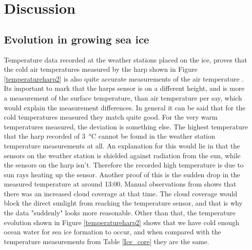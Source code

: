 \section{Discussion}



\subsection{Evolution in growing sea ice}
Temperature data recorded at the weather stations placed on the ice, proves that the cold air temperatures measured by the harp shown in Figure \autoref{temperatureharp2} is also quite accurate measurements of the air temperature \textcite{Weather}. Its important to mark that the harps sensor is on a different height, and is more a measurement of the surface temperature, than air temperature per say, which would explain the measurement differences. In general it can be said that for the cold temperatures measured they match quite good. For the very warm temperatures measured, the deviation is something else. The highest temperature that the harp recorded of \SI{3}{\celsius} cannot be found in the weather station temperature measurements at all. An explanation for this would lie in that the sensors on the weather station is shielded against radiation from the sun, while the sensors on the harp isn't. Therefore the recorded high temperature is due to sun rays heating up the sensor. Another proof of this is the sudden drop in the measured temperature at around 13:00. Manual observations from \textcite{Weather} shows that there was an increased cloud coverage at that time. The cloud coverage would block the direct sunlight from reaching the temperature sensor, and that is why the data "suddenly" looks more reasonable. Other than that, the temperature evolution shown in Figure \autoref{temperatureharp2} shows that we have cold enough ocean water for sea ice formation to occur, and when compared with the temperature measurements from Table \autoref{Ice_core} they are the same. \\
\\
